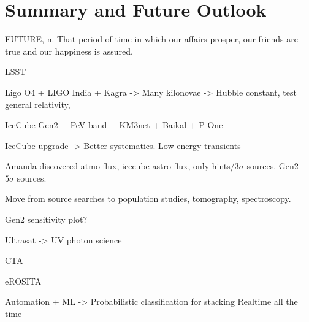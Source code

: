 \setchapterpreamble[u]{\margintoc}
\chapter{Summary and Future Outlook}
\begin{fquote} FUTURE, n. That period of time in which our affairs prosper, our friends are true and our happiness is assured.  
\end{fquote}

LSST

Ligo O4 + LIGO India + Kagra -> Many kilonovae -> Hubble constant, test general relativity, 

IceCube Gen2 + PeV band + KM3net + Baikal + P-One

IceCube upgrade -> Better systematics. Low-energy transients

Amanda discovered atmo flux, icecube astro flux, only hints/3$\sigma$ sources. Gen2 - $5\sigma$ sources.

Move from source searches to population studies, tomography, spectroscopy.

Gen2 sensitivity plot?

Ultrasat -> UV photon science

CTA

eROSITA

Automation + ML -> Probabilistic classification for stacking
Realtime all the time